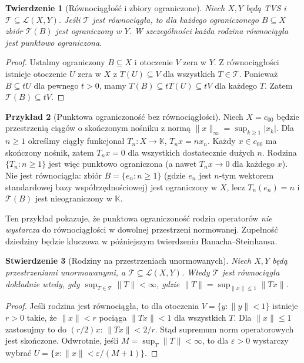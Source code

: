 \documentclass[11pt,a4paper]{article}
\numberwithin{equation}{section}
\theoremstyle{plain}
\newtheorem{twierdzenie}{Twierdzenie}[section]
\newtheorem{stwierdzenie}[twierdzenie]{Stwierdzenie}
\theoremstyle{definition}
\newtheorem{przyklad}[twierdzenie]{Przykład}
\theoremstyle{remark}
\newcommand{\K}{\mathbb K}
\begin{document}
\begin{twierdzenie}[Równociągłość i zbiory ograniczone]
\label{thm:equi-bounded}
Niech $X,Y$ będą TVS i $\mathcal T\subseteq\mathcal L(X,Y)$.
Jeśli $\mathcal T$ jest równociągła, to dla każdego
ograniczonego $B\subseteq X$ zbiór $\mathcal T(B)$
jest ograniczony w $Y$. W szczególności każda rodzina
równociągła jest punktowo ograniczona.
\end{twierdzenie}
\begin{proof}
Ustalmy ograniczony $B\subseteq X$ i otoczenie $V$ zera
w $Y$. Z równociągłości istnieje otoczenie $U$ zera
w $X$ z $T(U)\subseteq V$ dla wszystkich $T\in\mathcal T$.
Ponieważ $B\subseteq tU$ dla pewnego $t>0$, mamy
$T(B)\subseteq tT(U)\subseteq tV$ dla każdego $T$.
Zatem $\mathcal T(B)\subseteq tV$.
\end{proof}

\begin{przyklad}[Punktowa ograniczoność bez równociągłości]
\label{ex:c00-uniform-boundedness-failure}
Niech $X=c_{00}$ będzie przestrzenią ciągów o skończonym
nośniku z normą $\|x\|_\infty=\sup_{k\ge1}|x_k|$.
Dla $n\ge1$ określmy ciągły funkcjonał
$T_n:X\to\K$, $T_nx=nx_n$. Każdy $x\in c_{00}$
ma skończony nośnik, zatem $T_nx=0$ dla wszystkich
dostatecznie dużych $n$. Rodzina $\{T_n:n\ge1\}$
jest więc punktowo ograniczona (a nawet $T_nx\to0$
dla każdego $x$). Nie jest równociągła: zbiór
$B=\{e_n:n\ge1\}$ (gdzie $e_n$ jest $n$-tym wektorem
standardowej bazy współrzędnościowej) jest ograniczony w $X$, lecz
$T_n(e_n)=n$ i $\mathcal T(B)$ jest nieograniczony w $\K$.

Ten przykład pokazuje, że punktowa ograniczoność rodzin
operatorów \emph{nie wystarcza} do równociągłości w dowolnej
przestrzeni normowanej. Zupełność dziedziny będzie kluczowa
w późniejszym twierdzeniu Banacha--Steinhausa.
\end{przyklad}

\begin{stwierdzenie}[Rodziny na przestrzeniach unormowanych]
\label{prop:equi-normed}
Niech $X,Y$ będą przestrzeniami unormowanymi, a
$\mathcal T\subseteq\mathcal L(X,Y)$. Wtedy $\mathcal T$
jest równociągła dokładnie wtedy, gdy
$\sup_{T\in\mathcal T}\|T\|<\infty$,
gdzie $\|T\|=\sup_{\|x\|\le1}\|Tx\|$.
\end{stwierdzenie}
\begin{proof}
Jeśli rodzina jest równociągła, to dla otoczenia
$V=\{y:\|y\|<1\}$ istnieje $r>0$ takie, że
$\|x\|<r$ pociąga $\|Tx\|<1$ dla wszystkich $T$.
Dla $\|x\|\le1$ zastosujmy to do $(r/2)x$:
$\|Tx\|<2/r$. Stąd supremum norm operatorowych jest
skończone.
Odwrotnie, jeśli $M=\sup_T\|T\|<\infty$, to dla
$\varepsilon>0$ wystarczy wybrać
$U=\{x:\|x\|<\varepsilon/(M+1)\}$.
\end{proof}
\end{document}
